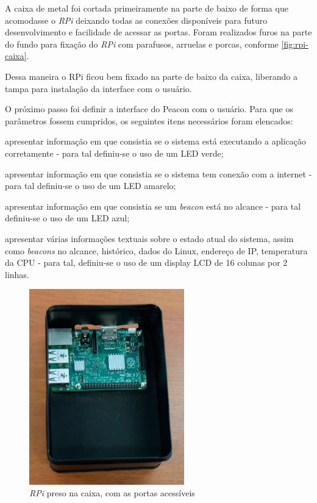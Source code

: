 A caixa de metal foi cortada primeiramente na parte de baixo de forma que acomodasse o \textit{RPi} deixando todas as conexões disponíveis para futuro desenvolvimento e facilidade de acessar as portas. Foram realizados furos na parte do fundo para fixação do \textit{RPi} com parafusos, arruelas e porcas, conforme \autoref{fig:rpi-caixa}.

Dessa maneira o RPi ficou bem fixado na parte de baixo da caixa, liberando a tampa para instalação da interface com o usuário.

O próximo passo foi definir a interface do Peacon com o usuário. Para que os parâmetros fossem cumpridos, os seguintes itens necessários foram elencados:

\begin{alineas}
	\item apresentar informação em que consistia se o sistema está executando a aplicação corretamente - para tal definiu-se o uso de um LED verde;
	\item apresentar informação em que consistia se o sistema tem conexão com a internet - para tal definiu-se o uso de um LED amarelo;
	\item apresentar informação em que consistia se um \textit{beacon} está no alcance - para tal definiu-se o uso de um LED azul;
	\item apresentar várias informações textuais sobre o estado atual do sistema, assim como \textit{beacons} no alcance, histórico, dados do Linux, endereço de IP, temperatura da CPU - para tal, definiu-se o uso de um display LCD de 16 colunas por 2 linhas.
\end{alineas}

\begin{figure}[htb]
	\caption{\label{fig:rpi-caixa}\textit{RPi} preso na caixa, com as portas acessíveis}
	\begin{center}
		\includegraphics[width=0.6\textwidth]{img/rpi-caixa.jpg}
	\end{center}
\end{figure}

